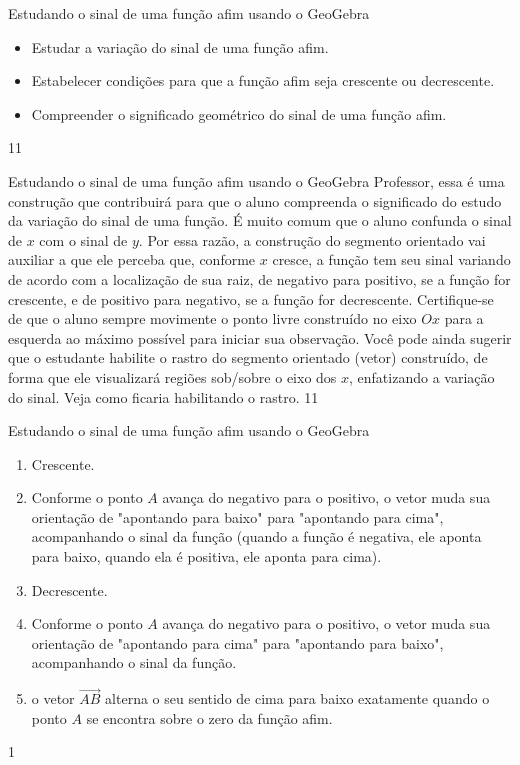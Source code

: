 \def\currentcolor{session1}
\begin{objectives}{Estudando o sinal de uma função afim usando o GeoGebra}
{
\begin{itemize}
\item Estudar a variação do sinal de uma função afim. 
\item Estabelecer condições para que a função afim seja crescente ou decrescente.
\item Compreender o significado geométrico do sinal de uma função afim.
\end{itemize}
}{1}{1}
\end{objectives}
\begin{sugestions}{Estudando o sinal de uma função afim usando o GeoGebra}
{
Professor, essa é uma construção que contribuirá para que o aluno compreenda o significado do estudo da variação do sinal de uma função. É muito comum que o aluno confunda o sinal de $x$ com o sinal de $y$. Por essa razão, a construção do segmento orientado vai auxiliar a que ele perceba que, conforme $x$ cresce, a função tem seu sinal variando de acordo com a localização de sua raiz, de negativo para positivo, se a função for crescente, e de positivo para negativo, se a função for decrescente. Certifique-se de que o aluno sempre movimente o ponto livre construído no eixo $Ox$ para a esquerda ao máximo possível para iniciar sua observação. Você pode ainda sugerir que o estudante habilite o rastro do segmento orientado (vetor) construído, de forma que ele visualizará regiões sob/sobre o eixo dos $x$, enfatizando a variação do sinal. Veja como ficaria habilitando o rastro.
}{1}{1}
\end{sugestions}
\clearmargin
\begin{answer}{Estudando o sinal de uma função afim usando o GeoGebra}
{
\begin{enumerate}
\item Crescente.
\item Conforme o ponto $A$ avança do negativo para o positivo, o vetor  muda sua orientação de "apontando para baixo" para "apontando para cima", acompanhando o sinal da função (quando a função é negativa, ele aponta para baixo, quando ela é positiva, ele aponta para cima).
\item Decrescente.
\item Conforme o ponto $A$ avança do negativo para o positivo, o vetor  muda sua orientação de "apontando para cima" para "apontando para baixo", acompanhando o sinal da função.
\item o vetor $\overrightarrow{AB}$ alterna o seu sentido de cima para baixo exatamente quando o ponto $A$ se encontra sobre o zero da função afim.
\end{enumerate}
}{1}
\end{answer}
\label{\detokenize{AF107-7:inequacoes-grau1}}\label{\detokenize{AF107-7::doc}}

